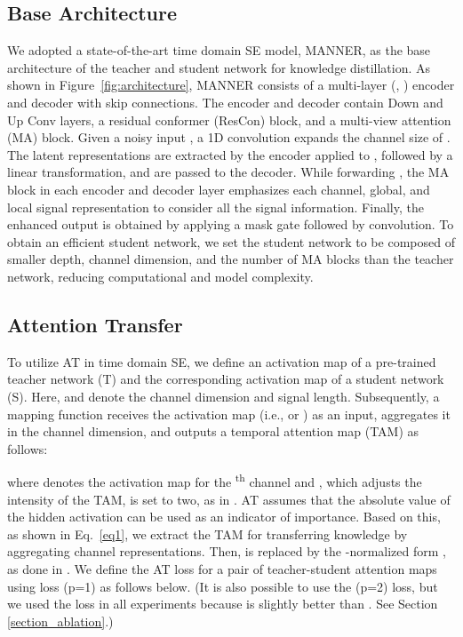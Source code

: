\documentclass[a4paper]{article}
\begin{document}
\subsection{Base Architecture}
We adopted a state-of-the-art time domain SE model, MANNER, as the base architecture of the teacher and student network for knowledge distillation. As shown in Figure~\ref{fig:architecture}, MANNER consists of a multi-layer (, ) encoder and decoder with skip connections. The encoder and decoder contain Down and Up Conv layers, a residual conformer (ResCon) block, and a multi-view attention (MA) block. Given a noisy input , a 1D convolution expands the channel size of . The latent representations are extracted by the encoder applied to , followed by a linear transformation, and are passed to the decoder. While forwarding , the MA block in each encoder and decoder layer emphasizes each channel, global, and local signal representation to consider all the signal information. Finally, the enhanced output  is obtained by applying a mask gate followed by convolution. To obtain an efficient student network, we set the student network to be composed of smaller depth, channel dimension, and the number of MA blocks than the teacher network, reducing computational and model complexity.
\newcommand\normx[1]{\left\Vert#1\right\Vert}   \subsection{Attention Transfer} \label{section:AT}
To utilize AT in time domain SE, we define an activation map  of a pre-trained teacher network (T) and the corresponding activation map  of a student network (S). Here,  and  denote the channel dimension and signal length. Subsequently, a mapping function  receives the activation map (i.e.,  or ) as an input, aggregates it in the channel dimension, and outputs a temporal attention map (TAM) as follows:

where  denotes the activation map for the \textsuperscript{th} channel and , which adjusts the intensity of the TAM, is set to two, as in \cite{zagoruyko2016paying}. AT assumes that the absolute value of the hidden activation can be used as an indicator of importance. Based on this, as shown in Eq.~\ref{eq1}, we extract the TAM for transferring knowledge by aggregating channel representations. Then,  is replaced by the -normalized form , as done in \cite{zagoruyko2016paying}. We define the AT loss for a pair of teacher-student attention maps using  loss (p=1) as follows below. (It is also possible to use the  (p=2) loss, but we used the  loss in all experiments because  is slightly better than . See Section \ref{section_ablation}.)
\end{document}
